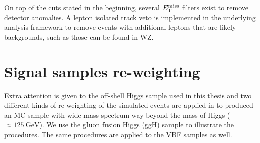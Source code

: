 On top of the cuts stated in the beginning, several $E_{\mathrm{T}}^{\mathrm{miss}}$ filters exist to remove detector 
anomalies. A lepton isolated track veto is implemented
in the underlying analysis framework to 
remove events with additional leptons that are likely backgrounds, such as those can be found in WZ.

\section{Signal samples re-weighting}
\label{sec:sig_rewgt}
Extra attention is given to the off-shell Higgs sample used in this thesis and two different kinds
of re-weighting of the simulated events are applied in to produced an MC sample with wide
mass spectrum way beyond the mass of Higgs ($\approx \SI{125}{\giga\electronvolt}$). We use the
gluon fusion Higgs (ggH) sample to illustrate the procedures. The same procedures are applied to
the VBF samples as well.

